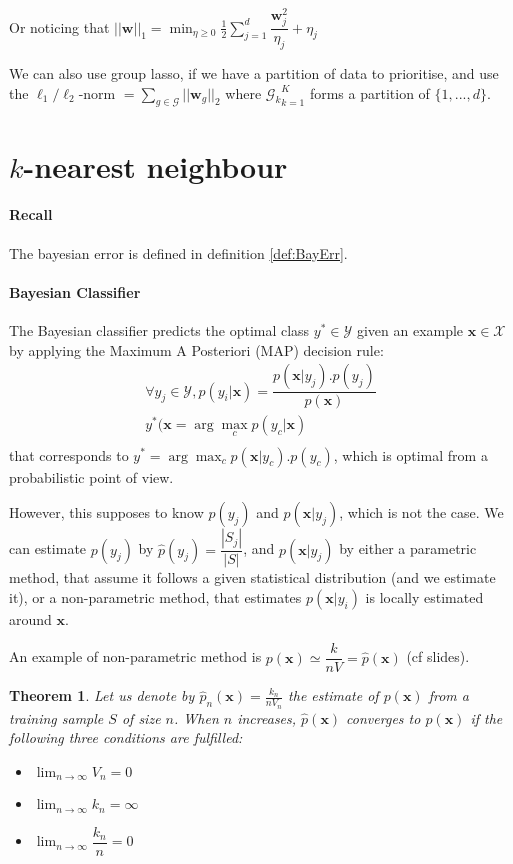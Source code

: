 \documentclass{article}
\newtheorem{thm}{Theorem}
\begin{document}
Or noticing that $||\mathbf{w}||_1=\min_{\eta \geq 0}\frac{1}{2} \sum_{j=1}^d \dfrac{\mathbf{w}_j^2}{\eta_j}+\eta_j $

We can also use group lasso, if we have a partition of data to prioritise, and use the $\ell_1/\ell_2$-norm $ = \sum_{g\in \mathcal{G}} || \mathbf{w}_g||_2$ where ${\mathcal{G}_k}_{k=1}^K$ forms a partition of $\{1,...,d\}$.


\section{$k$-nearest neighbour}
\paragraph{Recall}
The bayesian error is defined in definition \ref{def:BayErr}.

\paragraph{Bayesian Classifier}
The Bayesian classifier predicts the optimal class $y^*\in \mathcal{Y}$ given an example $\mathbf{x} \in \mathcal{X}$ by applying the Maximum A Posteriori (MAP) decision rule:
\begin{align*}
\forall y_j \in \mathcal{Y}, p(y_i|\mathbf{x}) = \dfrac{p(\mathbf{x}|y_j).p(y_j)}{p(\mathbf{x})}\\
y^* (\mathbf{x} = \arg \max_c p(y_c | \mathbf{x}) \\
\end{align*}
that corresponds to $y^* = \arg \max_c p(\mathbf{x}|y_c).p(y_c)$, which is optimal from a probabilistic point of view.
\bigskip

However, this supposes to know $p(y_j)$ and $p(\mathbf{x}|y_j)$, which is not the case. We can estimate $p(y_j)$ by $\hat{p}(y_j)=\dfrac{|S_j|}{|S|}$, and $p(\mathbf{x}|y_j)$ by either a parametric method, that assume it follows a given statistical distribution (and we estimate it), or a non-parametric method, that estimates $p(\mathbf{x}|y_i)$ is locally estimated around $\mathbf{x}$.

An example of non-parametric method is $p(\mathbf{x}) \simeq \dfrac{k}{nV} = \hat{p}(\mathbf{x})$ (cf slides).








\begin{thm}
Let us denote by $\hat{p}_n(\mathbf{x})=\frac{k_n}{nV_n}$ the estimate of $p(\mathbf{x})$ from a training sample $S$ of size $n$. When $n$ increases, $\hat{p}(\mathbf{x})$ converges to $p(\mathbf{x})$ if the following three conditions are fulfilled:
\begin{itemize}
\item $\lim_{n\to\infty} V_n = 0$
\item $\lim_{n\to\infty} k_n = \infty$
\item $\lim_{n\to\infty} \dfrac{k_n}{n} =0$
\end{itemize}
\end{thm}
\end{document}
